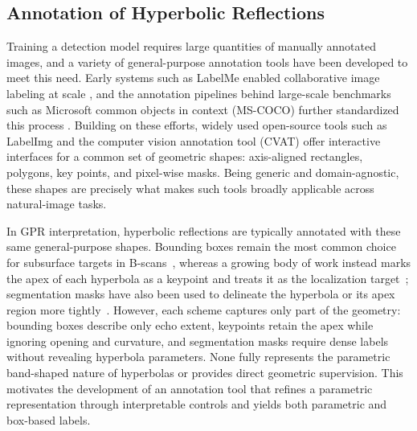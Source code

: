 \documentclass[lettersize,journal]{IEEEtran}
\begin{document}


\subsection{Annotation of Hyperbolic Reflections}
Training a detection model requires large quantities of manually annotated images,
and a variety of general-purpose annotation tools have been developed to meet this need.
Early systems such as LabelMe enabled collaborative image labeling at scale \cite{russell2008labelme},
and the annotation pipelines behind large-scale benchmarks such as Microsoft common objects in context (MS-COCO)
further standardized this process \cite{lin2014coco}.
Building on these efforts, widely used open-source tools such as LabelImg \cite{tzutalin2015labelimg}
and the computer vision annotation tool (CVAT) \cite{cvat} offer interactive interfaces for a common set of
geometric shapes: axis-aligned rectangles, polygons, key points, and pixel-wise masks.
Being generic and domain-agnostic, these shapes are precisely 
what makes such tools broadly applicable across natural-image tasks.

In GPR interpretation, hyperbolic reflections are typically annotated with these same general-purpose shapes.
Bounding boxes remain the most common choice for subsurface targets in B-scans~\cite{besaw2015deep},
whereas a growing body of work instead marks the apex of each hyperbola as a keypoint and treats it as
the localization target~\cite{hou2025endtoend,lan2024statespace}; segmentation masks have also been used to
delineate the hyperbola or its apex region more tightly~\cite{hou2021msrcnn}.
However, each scheme captures only part of the geometry: bounding boxes describe only echo extent, keypoints retain the apex while ignoring opening and curvature, and segmentation masks require dense labels without revealing hyperbola parameters. None fully represents the parametric band-shaped nature of hyperbolas or provides direct geometric supervision. 
This motivates the development of an annotation tool that refines a parametric representation through interpretable controls and yields both parametric and box-based labels.
\end{document}

